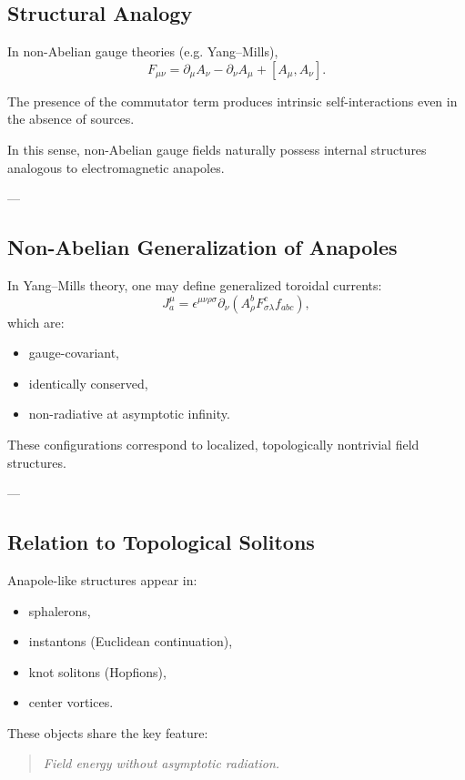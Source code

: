 \documentclass[11pt]{article}
\begin{document}
\subsection{Structural Analogy}

In non-Abelian gauge theories (e.g. Yang–Mills),
\[
F_{\mu\nu} = \partial_\mu A_\nu - \partial_\nu A_\mu + [A_\mu, A_\nu].
\]

The presence of the commutator term produces intrinsic self-interactions even in the absence of sources.

In this sense, non-Abelian gauge fields naturally possess internal structures analogous to electromagnetic anapoles.

---

\subsection{Non-Abelian Generalization of Anapoles}

In Yang–Mills theory, one may define generalized toroidal currents:
\[
J^\mu_a = \epsilon^{\mu\nu\rho\sigma} \partial_\nu \left( A^b_\rho F^c_{\sigma\lambda} f_{abc} \right),
\]
which are:
\begin{itemize}
\item gauge-covariant,
\item identically conserved,
\item non-radiative at asymptotic infinity.
\end{itemize}

These configurations correspond to localized, topologically nontrivial field structures.

---

\subsection{Relation to Topological Solitons}

Anapole-like structures appear in:
\begin{itemize}
\item sphalerons,
\item instantons (Euclidean continuation),
\item knot solitons (Hopfions),
\item center vortices.
\end{itemize}

These objects share the key feature:
\begin{quote}
\emph{Field energy without asymptotic radiation.}
\end{quote}
\end{document}
